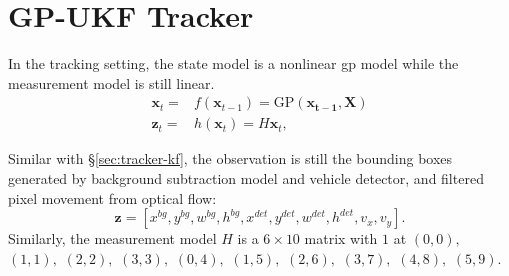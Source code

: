 \section{GP-UKF Tracker}

In the tracking setting, the state model is a nonlinear \gls{gp} model while the measurement model is still linear.
\begin{align}
\mathbf{x}_t = & f(\mathbf{x}_{t-1}) = \text{GP}(\mathbf{x_{t-1}}, \mathbf{X}) \\
\mathbf{z}_t = & h(\mathbf{x}_t) = H\mathbf{x}_t,
\end{align}

Similar with \S\ref{sec:tracker-kf}, the observation is still the bounding boxes generated by background subtraction model and vehicle detector, and filtered pixel movement from optical flow: 
$$\mathbf{z}=[x^{bg}, y^{bg}, w^{bg}, h^{bg}, x^{det}, y^{det}, w^{det}, h^{det}, v_x, v_y].$$ 
Similarly, the measurement model $H$ is a $6\times10$ matrix with $1$ at $(0, 0),$ $(1, 1),$ $(2, 2),$ $(3, 3),$ $(0, 4),$ $(1, 5),$ $(2, 6),$ $(3, 7),$ $(4, 8),$ $(5,9)$.


